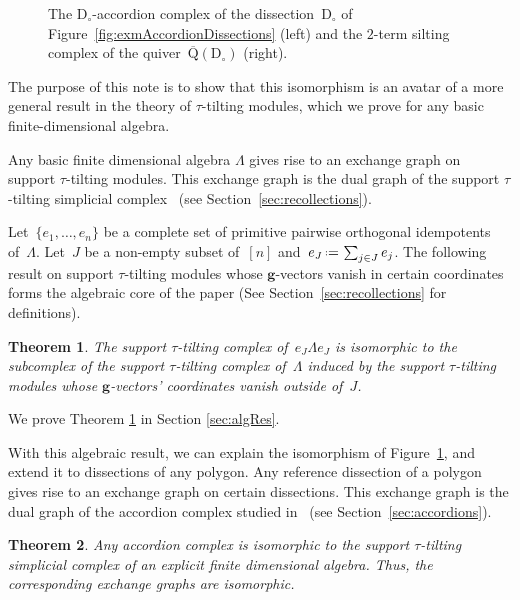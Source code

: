 \documentclass{amsart}
\newtheorem{theorem}{Theorem}%
\theoremstyle{definition}
\renewcommand{\b}[1]{\mathbf{#1}} %
\newcommand{\eqdef}{\mbox{\,\raisebox{0.2ex}{\scriptsize\ensuremath{\mathrm:}}\ensuremath{=}\,}} %
\newcommand{\fref}[1]{Figure~\ref{#1}} %
\newcommand{\dissection}{\mathrm{D}} %
\newcommand{\quiver}{\mathrm{Q}} %
\begin{document}
\begin{figure}
	\capstart
	\centerline{\accordiohedronAccordionTikz{}\hspace{.8cm}\accordiohedronSiltingTikz{}}
	\caption{The $\dissection_\circ$-accordion complex of the dissection~$\dissection_\circ$ of \fref{fig:exmAccordionDissections} (left) and the $2$-term silting complex of the quiver~$\overline{\quiver}(\dissection_\circ)$ (right).}
	\label{fig:accordiohedron}
\end{figure}

The purpose of this note is to show that this isomorphism is an avatar of a more general result in the theory of $\tau$-tilting modules,
which we prove for any basic finite-dimensional algebra.

Any basic finite dimensional algebra $\Lambda$ gives rise to an exchange graph on support $\tau$-tilting modules. 
This exchange graph is the dual graph of the support $\tau$-tilting simplicial complex~\cite{AdachiIyamaReiten} (see Section~\ref{sec:recollections}).

Let~$\{e_1, \dots, e_n\}$ be a complete set of primitive pairwise orthogonal idempotents of~$\Lambda$. 
Let~$J$ be a non-empty subset of~$[n]$ and~$e_J \eqdef \sum_{j \in J} e_j$.
The following result on support $\tau$-tilting modules whose $\b{g}$-vectors vanish in certain coordinates
forms the algebraic core of the paper (See Section~\ref{sec:recollections} for definitions). 

\begin{theorem}
\label{thm:mainAlgThm}
The support $\tau$-tilting complex of~$e_J \Lambda e_J$ is isomorphic to the subcomplex of the support $\tau$-tilting complex of~$\Lambda$ induced by the support $\tau$-tilting modules whose $\b{g}$-vectors' coordinates vanish outside of~$J$.
\end{theorem}

We prove Theorem \ref{thm:mainAlgThm} in Section \ref{sec:algRes}.

With this algebraic result, we can explain the isomorphism of \fref{fig:accordiohedron}, 
and extend it to dissections of any polygon.
Any reference dissection of a polygon gives rise to an exchange graph on certain dissections.
This exchange graph is the dual graph of the accordion complex studied in~\cite{Chapoton-quadrangulations, GarverMcConville, MannevillePilaud-accordion} (see Section~\ref{sec:accordions}).

\begin{theorem}
\label{thm:mainDissection}
Any accordion complex is isomorphic to the support $\tau$-tilting simplicial complex of an explicit finite dimensional algebra. Thus, the corresponding exchange graphs are isomorphic.
\end{theorem}
\end{document}
